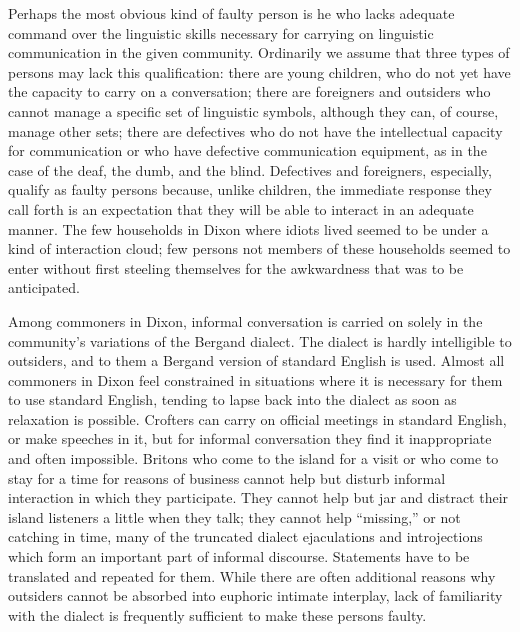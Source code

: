 \documentclass[twoside,symmetric,nobib,justified]{tufte-book}
\begin{document}
Perhaps the most obvious kind of faulty person is he who lacks adequate
command over the linguistic skills necessary for carrying on linguistic
communication in the given community. Ordinarily we assume that three
types of persons may lack this qualification: there are young children,
who do not yet have the capacity to carry on a conversation; there are
foreigners and outsiders who cannot manage a specific set of linguistic
symbols, although they can, of course, manage other sets; there are
defectives who do not have the intellectual capacity for communication
or who have defective communication equipment, as in the case of the
deaf, the dumb, and the blind. Defectives and foreigners, especially,
qualify as faulty persons because, unlike children, the immediate
response they call forth is an expectation that they will be able to
interact in an adequate manner. The few households in Dixon where idiots
lived seemed to be under a kind of interaction cloud; few persons not
members of these households seemed to enter without first steeling
themselves for the awkwardness that was to be anticipated.

\newpage Among commoners in Dixon, informal conversation is carried on solely in
the community's variations of the Bergand dialect. The dialect is hardly
intelligible to outsiders, and to them a Bergand version of standard
English is used. Almost all commoners in Dixon feel constrained in
situations where it is necessary for them to use standard English,
tending to lapse back into the dialect as soon as relaxation is
possible. Crofters can carry on official meetings in standard English,
or make speeches in it, but for informal conversation they find it
inappropriate and often impossible. Britons who come to the island for a
visit or who come to stay for a time for reasons of business cannot help
but disturb informal interaction in which they participate. They cannot
help but jar and distract their island listeners a little when they
talk; they cannot help ``missing,'' or not catching in time, many of the
truncated dialect ejaculations and introjections which form an important
part of informal discourse. Statements have to be translated and
repeated for them. While there are often additional reasons why
outsiders cannot be absorbed into euphoric intimate interplay, lack of
familiarity with the dialect is frequently sufficient to make these
persons faulty.
\end{document}
